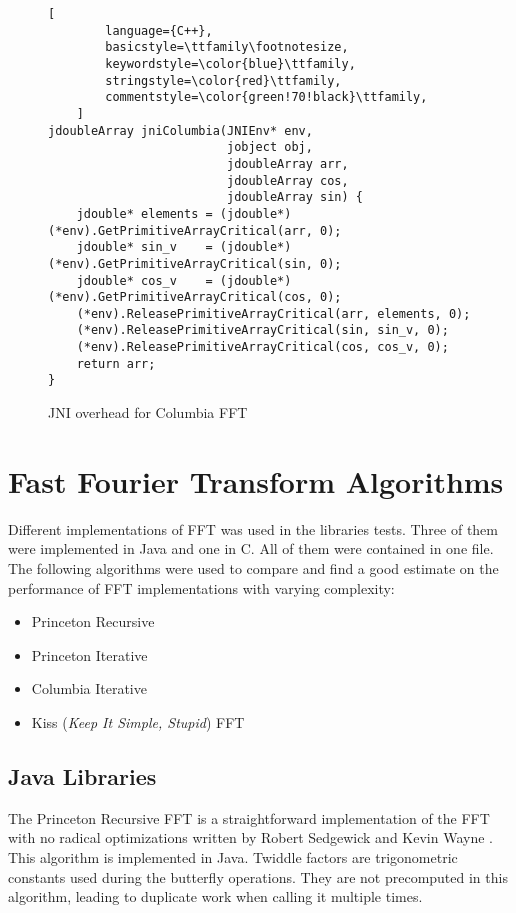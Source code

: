 \begin{figure}
\begin{lstlisting}[
        language={C++},
        basicstyle=\ttfamily\footnotesize,
        keywordstyle=\color{blue}\ttfamily,
        stringstyle=\color{red}\ttfamily,
        commentstyle=\color{green!70!black}\ttfamily,
    ]
jdoubleArray jniColumbia(JNIEnv* env,
                         jobject obj,
                         jdoubleArray arr,
                         jdoubleArray cos,
                         jdoubleArray sin) {
    jdouble* elements = (jdouble*)(*env).GetPrimitiveArrayCritical(arr, 0);
    jdouble* sin_v    = (jdouble*)(*env).GetPrimitiveArrayCritical(sin, 0);
    jdouble* cos_v    = (jdouble*)(*env).GetPrimitiveArrayCritical(cos, 0);
    (*env).ReleasePrimitiveArrayCritical(arr, elements, 0);
    (*env).ReleasePrimitiveArrayCritical(sin, sin_v, 0);
    (*env).ReleasePrimitiveArrayCritical(cos, cos_v, 0);
    return arr;
}
\end{lstlisting}
\caption{JNI overhead for Columbia FFT}
\label{fig:jni:columbia}
\end{figure}

\section{Fast Fourier Transform Algorithms}

Different implementations of FFT was used in the libraries tests. Three of them were implemented in Java and one in C. All of them were contained in one file. The following algorithms were used to compare and find a good estimate on the performance of FFT implementations with varying complexity:

\begin{itemize}
    \item Princeton Recursive \cite{princeton:recursive}
    \item Princeton Iterative \cite{princeton:iterative}
    \item Columbia Iterative \cite{columbia:iterative}
    \item Kiss (\emph{Keep It Simple, Stupid}) FFT \cite{kiss:fft}
\end{itemize}

\subsection{Java Libraries}

The Princeton Recursive FFT is a straightforward implementation of the FFT with no radical optimizations written by Robert Sedgewick and Kevin Wayne \cite{princeton:recursive}. This algorithm is implemented in Java. Twiddle factors are trigonometric constants used during the butterfly operations. They are not precomputed in this algorithm, leading to duplicate work when calling it multiple times.

